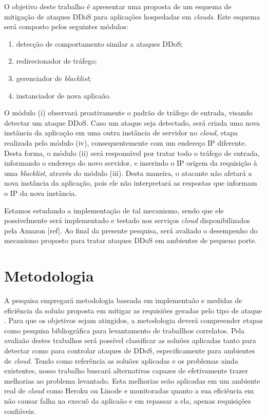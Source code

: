\documentclass[a4paper, 11pt]{article}
\begin{document}
O objetivo deste trabalho é apresentar uma proposta de um esquema de mitigação
de ataques DDoS para aplicações hospedadas em \emph{clouds}. Este esquema será
composto pelos seguintes módulos:
\begin{enumerate}[i]
  \item detecção de comportamento similar a ataques DDoS;
  \item redirecionador de tráfego;
  \item gerenciador de \emph{blacklist};
  \item instanciador de nova aplica\cc\~ao.
\end{enumerate}  

O módulo (i) observará proativamente o padrão de tráfego de entrada, visando detectar um ataque DDoS. Caso um ataque seja detectado, será criada uma nova instância da aplicação em uma outra instância de servidor no \emph{cloud}, etapa realizada pelo m\'odulo (iv), consequentemente com um endereço IP diferente. Desta forma, o módulo (ii) será responsável por tratar todo o tráfego de entrada, informando o endereço do novo servidor, e inserindo o IP origem da requisição à uma \emph{blacklist}, através do módulo (iii). Desta maneira, o atacante não afetará a nova instância da aplicação, pois ele não interpretará as respostas que informam o IP da nova instância. 

Estamos estudando a implementação de tal mecanismo, sendo que ele possivelmente
será implementado e testado nos serviços \emph{cloud} disponibilizados pela
Amazon [ref]. Ao final da presente pesquisa, ser\'a avaliado o
desempenho do mecanismo proposto para tratar ataques DDoS em ambientes de
pequeno porte.


\section{Metodologia}
A pesquisa empregar\'a metodologia baseada em implementa\cc\~ao e medidas de
efici\^encia da solu\cc\~ao proposta em mitigar as requisi\cc\~oes geradas pelo
tipo de ataque . Para que os objetivos sejam atingidos, a metodologia dever\'a
compreender etapas como pesquisa bibliogr\'afica para levantamento de traballhos
correlatos. Pela avalia\cc\~ao destes trabalhos ser\'a poss\'ivel classificar as
solu\cc\~oes aplicadas tanto para detectar como para controlar ataques de DDoS,
especificamente para ambientes de \emph{cloud}. Tendo como refer\^encia as
solu\cc\~oes aplicadas e os problemas ainda existentes, nosso trabalho buscar\'a
alternativas capazes de efetivamente trazer melhorias ao problema levantado.
Esta melhorias se\~ao aplicadas em um ambiente real de \emph{cloud} como Heroku
ou Linode e monitoradas quanto a sua efici\^encia em n\~ao causar falha na
execu\cca\~o da aplica\cc\~ao e em repassar a ela, apenas requisições
confi\'aveis.
\end{document}
